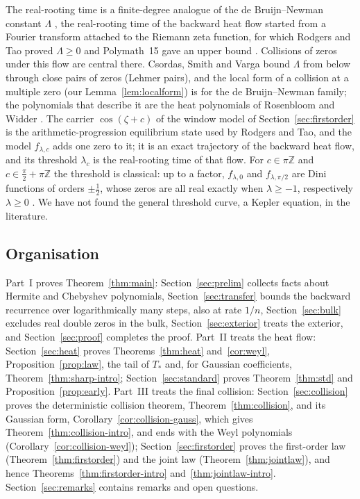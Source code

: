 \documentclass[11pt]{amsart}
\theoremstyle{definition}
\theoremstyle{remark}
\numberwithin{equation}{section}
\newcommand{\Z}{\mathbb{Z}}
\begin{document}
The real-rooting time is a finite-degree analogue of the de Bruijn--Newman constant $\Lambda$ \cite{dB,Ne}, the real-rooting time of the backward heat flow started from a Fourier transform attached to the Riemann zeta function, for which Rodgers and Tao proved $\Lambda\ge0$ \cite{RT} and Polymath~15 gave an upper bound \cite{PM15}. Collisions of zeros under this flow are central there. Csordas, Smith and Varga \cite{CSV} bound $\Lambda$ from below through close pairs of zeros (Lehmer pairs), and the local form of a collision at a multiple zero (our Lemma~\ref{lem:localform}) is \cite[Proposition~3.1(ii)]{PM15} for the de Bruijn--Newman family; the polynomials that describe it are the heat polynomials of Rosenbloom and Widder \cite{RW}. The carrier $\cos(\zeta+c)$ of the window model of Section~\ref{sec:firstorder} is the arithmetic-progression equilibrium state used by Rodgers and Tao, and the model $f_{\lambda,c}$ adds one zero to it; it is an exact trajectory of the backward heat flow, and its threshold $\lambda_c$ is the real-rooting time of that flow. For $c\in\pi\Z$ and $c\in\frac\pi2+\pi\Z$ the threshold is classical: up to a factor, $f_{\lambda,0}$ and $f_{\lambda,\pi/2}$ are Dini functions of orders $\pm\frac12$, whose zeros are all real exactly when $\lambda\ge-1$, respectively $\lambda\ge0$ \cite[\S15.25, p.~482]{Wat}. We have not found the general threshold curve, a Kepler equation, in the literature.

\subsection{Organisation}
Part~I proves Theorem~\ref{thm:main}: Section~\ref{sec:prelim} collects facts about Hermite and Chebyshev polynomials, Section~\ref{sec:transfer} bounds the backward recurrence over logarithmically many steps, also at rate $1/n$, Section~\ref{sec:bulk} excludes real double zeros in the bulk, Section~\ref{sec:exterior} treats the exterior, and Section~\ref{sec:proof} completes the proof. Part~II treats the heat flow: Section~\ref{sec:heat} proves Theorems~\ref{thm:heat} and~\ref{cor:weyl}, Proposition~\ref{prop:law}, the tail of $T_*$ and, for Gaussian coefficients, Theorem~\ref{thm:sharp-intro}; Section~\ref{sec:standard} proves Theorem~\ref{thm:std} and Proposition~\ref{prop:early}. Part~III treats the final collision: Section~\ref{sec:collision} proves the deterministic collision theorem, Theorem~\ref{thm:collision}, and its Gaussian form, Corollary~\ref{cor:collision-gauss}, which gives Theorem~\ref{thm:collision-intro}, and ends with the Weyl polynomials (Corollary~\ref{cor:collision-weyl}); Section~\ref{sec:firstorder} proves the first-order law (Theorem~\ref{thm:firstorder}) and the joint law (Theorem~\ref{thm:jointlaw}), and hence Theorems~\ref{thm:firstorder-intro} and~\ref{thm:jointlaw-intro}. Section~\ref{sec:remarks} contains remarks and open questions.
\end{document}
